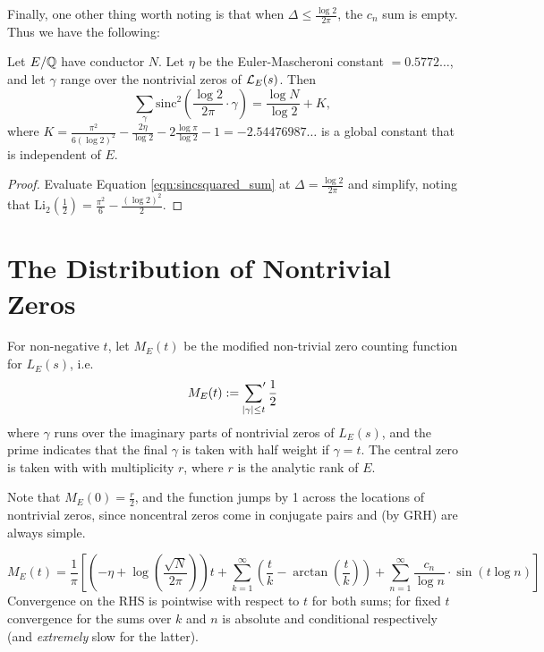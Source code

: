 \documentclass[10pt]{article}
\newcommand{\pr}{^{\prime}}
\newcommand{\Les}{L_E(s)}
\newcommand{\sinc}{\text{sinc}}
\newcommand{\Li}{\text{Li}}
\begin{document}
Finally, one other thing worth noting is that when $\Delta \le \frac{\log 2}{2\pi}$, the $c_n$ sum is empty. Thus we have the following:
\begin{corollary}
Let $E/\mathbb{Q}$ have conductor $N$. Let $\eta$ be the Euler-Mascheroni constant $=0.5772\ldots$, and let $\gamma$ range over the nontrivial zeros of $\mathcal{L}_E(s)$. Then
\begin{equation}
\sum_{\gamma} \sinc^2\left(\frac{\log 2}{2\pi} \cdot \gamma \right) = \frac{\log N}{\log 2} + K,
\end{equation}
where $K = \frac{\pi^2}{6(\log 2)^2} - \frac{2\eta}{\log 2} - 2\frac{\log \pi}{\log 2} - 1 = -2.54476987\ldots$ is a global constant that is independent of $E$.
\end{corollary}
\begin{proof}
Evaluate Equation \ref{eqn:sincsquared_sum} at $\Delta = \frac{\log 2}{2\pi}$ and simplify, noting that $\Li_2\left(\frac{1}{2}\right) = \frac{\pi^2}{6} - \frac{(\log 2)^2}{2}$.
\end{proof}

\newpage
\section{The Distribution of Nontrivial Zeros}

\begin{definition}
For non-negative $t$, let $M_E(t)$ be the modified non-trivial zero counting function for $\Les$, i.e.
\begin{equation}
M_E(t) := \sideset{}{\pr}\sum_{|\gamma| \le t} \frac{1}{2}
\end{equation}
where $\gamma$ runs over the imaginary parts of nontrivial zeros of $L_E(s)$, and the prime indicates that the final $\gamma$ is taken with half weight if $\gamma = t$. The central zero is taken with with multiplicity $r$, where $r$ is the analytic rank of $E$. \\
\end{definition}

Note that $M_E(0) = \frac{r}{2}$, and the function jumps by 1 across the locations of nontrivial zeros, since noncentral zeros come in conjugate pairs and (by GRH) are always simple. \\

\begin{proposition}[S.]
\begin{equation}\label{eqn:M_E(t)}
M_E(t) = \frac{1}{\pi}\left[\left(-\eta+\log\left(\frac{\sqrt{N}}{2\pi}\right)\right) t + \sum_{k=1}^{\infty} \left(\frac{t}{k} - \arctan\left(\frac{t}{k}\right)\right) + \sum_{n=1}^{\infty} \frac{c_n}{\log n}\cdot \sin(t\log n)\right]
\end{equation}
Convergence on the RHS is pointwise with respect to $t$ for both sums; for fixed $t$ convergence for the sums over $k$ and $n$ is absolute and conditional respectively (and {\it extremely} slow for the latter).
\end{proposition}
\end{document}
